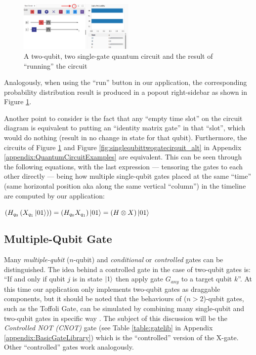 \documentclass[conference]{IEEEtran}
\begin{document}
\begin{figure}[tbp]
    \centerline{
        \includegraphics[width=0.5\textwidth]{img/single-gate-2-qubits-result.png}
    }
    \caption{A two-qubit, two single-gate quantum circuit and the result of ``running'' the circuit}
    \label{fig:twoqubittwosinglegateresult}
\end{figure}


Analogously, when using the ``run'' button in our application, the corresponding probability distribution result is
produced in a popout right-sidebar as shown in Figure \ref{fig:twoqubittwosinglegateresult}.

Another point to consider is the fact that any ``empty time slot'' on the circuit diagram is equivalent to putting
an ``identity matrix gate'' in that ``slot'', which would do nothing (result in no change in state for that qubit). Furthermore,
the circuits of Figure \ref{fig:twoqubittwosinglegateresult} and Figure \ref{fig:singlequbittwogatecirquit_alt}
in Appendix \ref{appendix:QuantumCircuitExamples} are equivalent.
This can be seen through the following equations,
with the last expression — tensoring the gates to each other directly — being how multiple single-qubit
gates placed at the same ``time'' (same horizontal position aka along the same vertical ``column'') in the timeline are computed by our application:

\begin{center}
$
\left(H_{q_0}\left(X_{q_1}\ket{01}\right)\right)
=
\left(H_{q_0}X_{q_1}\right)\ket{01}
=
\left(H \otimes X\right)\ket{01}
$
\end{center}

\subsection{Multiple-Qubit Gate}
\label{sec:MultiQubitGate}

Many \textit{multiple-qubit} ($n$-qubit) and \textit{conditional} or \textit{controlled} gates can be distinguished.
The idea behind a controlled gate in the case of two-qubit gates is:
``If and only if qubit $j$ is in state $\ket{1}$ then apply gate $G_{any}$ to a target qubit $k$''.
At this time our application only implements two-qubit gates as draggable components, but it should be noted that the behaviours of ($n>2$)-qubit gates,
such as the Toffoli Gate, can be simulated by combining many single-qubit and two-qubit gates in specific way \cite{ref:quantumvialinearalgebra}.
The subject of this discussion will be the \textit{Controlled NOT (CNOT)} gate
(see Table \ref{table:gatelib} in Appendix \ref{appendix:BasicGateLibrary})
which is the ``controlled'' version of the X-gate. Other ``controlled'' gates work analogously.
\end{document}
